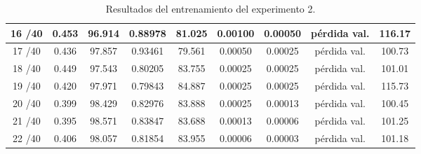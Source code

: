 \begin{table}[ht]
\begin{tabular}{|c|c|c|c|c|c|c|c|c|}
            16 /40 & 0.453  & 96.914 & 0.88978 & 81.025 & 0.00100 & 0.00050 & pérdida val. & 116.17 \\ \hline
            17 /40 & 0.436  & 97.857 & 0.93461 & 79.561 & 0.00050 & 0.00025 & pérdida val. & 100.73 \\ \hline
            18 /40 & 0.449  & 97.543 & 0.80205 & 83.755 & 0.00025 & 0.00025 & pérdida val. & 101.01 \\ \hline
            19 /40 & 0.420  & 97.971 & 0.79843 & 84.887 & 0.00025 & 0.00025 & pérdida val. & 115.73 \\ \hline
            20 /40 & 0.399  & 98.429 & 0.82976 & 83.888 & 0.00025 & 0.00013 & pérdida val. & 100.45 \\ \hline
            21 /40 & 0.395  & 98.571 & 0.83847 & 83.688 & 0.00013 & 0.00006 & pérdida val. & 101.25 \\ \hline
            22 /40 & 0.406  & 98.057 & 0.81854 & 83.955 & 0.00006 & 0.00003 & pérdida val. & 101.18 \\ \hline
            \end{tabular}
            \caption{Resultados del entrenamiento del experimento 2.}
            \label{tab:training_results_b2}
            \end{table}
            